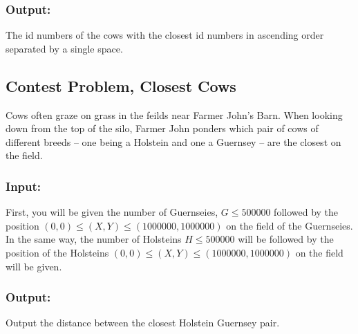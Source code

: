 \subsubsection{Output:} The id numbers of the cows with the closest id numbers in ascending order separated by a single space.

\subsection{Contest Problem, Closest Cows}
Cows often graze on grass in the feilds near Farmer John's Barn.
When looking down from the top of the silo, Farmer John ponders which pair of cows of different breeds -- one being a Holstein and one a Guernsey -- are the closest on the field.
\subsubsection{Input:} First, you will be given the number of Guernseies, $ G \leq 500000$ followed by the position $(0,0) \leq (X,Y) \leq (1000000,1000000)$ on the field of the Guernseies.
In the same way, the number of Holsteins $H \leq 500000$ will be followed by the position of the Holsteins $(0,0) \leq (X,Y) \leq (1000000,1000000)$ on the field will be given.
\subsubsection{Output:} Output the distance between the closest Holstein Guernsey pair.
